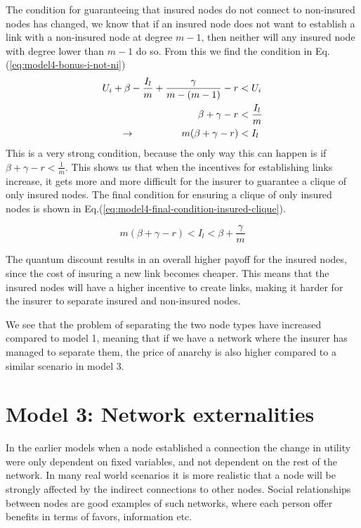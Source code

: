 The condition for guaranteeing that insured nodes do not connect to non-insured nodes has changed, we know that if an insured node does not want to establish a link with a non-insured node at degree $m-1$, then neither will any insured node with degree lower than $m-1$ do so. From this we find the condition in Eq.(\ref{eq:model4-bonus-i-not-ni})
\begin{eqnarray}
U_{i}+\beta-\frac{I_{l}}{m}+\frac{\gamma}{m-(m-1)}-r&<U_{i} \nonumber \\ 
\beta+\gamma-r&<\frac{I_{l}}{m}\nonumber \\ 
\llap{$\rightarrow$\hspace{50pt}}m(\beta +\gamma-r)&<I_{l}\nonumber
\label{eq:model4-bonus-i-not-ni}
\end{eqnarray}
This is a very strong condition, because the only way this can happen is if $\beta+\gamma-r<\frac{1}{m}$.  This shows us that when the incentives for establishing links increase, it gets more and more difficult for the insurer to guarantee a clique of only insured nodes. 
The final condition for ensuring a clique of only insured nodes is shown in Eq.(\ref{eq:model4-final-condition-insured-clique}).

\begin{equation}
m(\beta +\gamma-r)<I_{l}<\beta+\frac{\gamma}{m}
\label{eq:model4-final-condition-insured-clique}
\end{equation}

The quantum discount results in an overall higher payoff for the insured nodes, since the cost of insuring a new link becomes cheaper. This means that the insured nodes will have a higher incentive to create links, making it harder for the insurer to separate insured and non-insured nodes.

We see that the problem of separating the two node types have increased compared to model 1, meaning that if we have a network where the insurer has managed to separate them, the price of anarchy is also higher compared to a similar scenario in model 3. 

\section{Model 3: Network externalities}
In the earlier models when a node established a connection the change in utility were only dependent on fixed variables, and not dependent on the rest of the network. In many real world scenarios it is more realistic that a node will be strongly affected by the indirect connections to other nodes. Social relationships between nodes are good examples of such networks, where each person offer benefits in terms of favors, information etc. 

